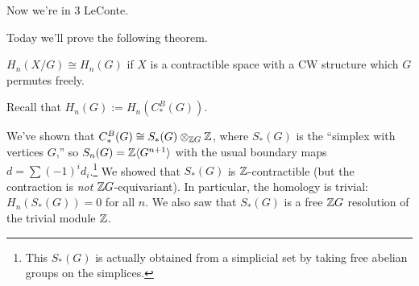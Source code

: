 
Now we're in 3 LeConte.

Today we'll prove the following theorem.
\begin{theorem}\label{05T:X/G}
 $H_n(X/G)\cong H_n(G)$ if $X$ is a contractible space with a CW structure which $G$ permutes freely.
\end{theorem}
Recall that $H_n(G):=H_n(C_*^B(G))$.

We've shown that $C_*^B(G)\cong S_*(G)\otimes_{\mathbb{Z} G}\mathbb{Z}$, where $S_*(G)$ is the ``simplex with vertices $G$,'' so $S_n(G)=\mathbb{Z}\langle G^{n+1}\rangle$ with the usual boundary maps $d=\sum (-1)^i d_i$.\footnote{This $S_*(G)$ is actually obtained from a simplicial set by taking free abelian groups on the simplices.} We showed that $S_*(G)$ is $\mathbb{Z}$-contractible (but the contraction is \emph{not} $\mathbb{Z} G$-equivariant). In particular, the homology is trivial: $H_n(S_*(G))=0$ for all $n$. We also saw that $S_*(G)$ is a free $\mathbb{Z} G$ resolution of the trivial module $\mathbb{Z}$.

